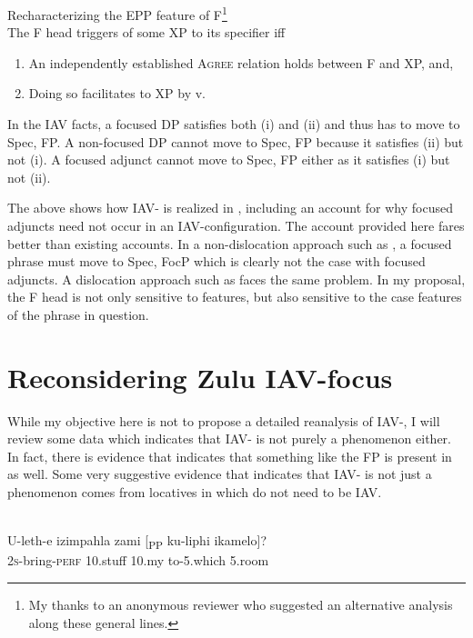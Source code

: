 \documentclass[output=paper
,newtxmath
,modfonts
,nonflat]{langsci/langscibook}
\begin{document}
\ea\label{ex:selvanathan:14}
Recharacterizing the EPP feature of F\footnote{My thanks to an anonymous reviewer who suggested an alternative analysis along these general lines.} \\
The F head triggers  of some XP to its specifier iff 

\begin{enumerate}
\item 
An independently established \textsc{Agree} relation holds between F and XP, and,
\item 
Doing so facilitates  to XP by v. 
\end{enumerate}
\z

In the  IAV facts, a focused DP satisfies both (i) and (ii) and thus has to move to Spec, FP. A non-focused DP cannot move to Spec, FP because it satisfies (ii) but not (i). A focused adjunct cannot move to Spec, FP either as it satisfies (i) but not (ii). 

The above shows how IAV- is realized in , including an account for why focused adjuncts need not occur in an IAV-configuration. The account provided here fares better than existing accounts. In a non-dislocation approach such as \citet{vanderwal2006}, a focused phrase must move to Spec, FocP which is clearly not the case with  focused adjuncts. A dislocation approach such as \citet{chengdowning2012} faces the same problem. In my proposal, the F head is not only sensitive to  features, but also sensitive to the case features of the phrase in question.

\section{ Reconsidering Zulu IAV-focus}

While my objective here is not to propose a detailed reanalysis of  IAV-, I will review some data which indicates that  IAV- is not purely a  phenomenon either. In fact, there is evidence that indicates that something like the FP is present in  as well. Some very suggestive evidence that indicates that  IAV- is not just a  phenomenon comes from locatives in  which do not need to be IAV. 

\ea\label{ex:selvanathan:15}
 \citep[168]{Buell2009}\\
\ea\label{ex:selvanathan:15a}
	\gll U-leth-e      izimpahla  zami   [\textsubscript{PP} ku-liphi      ikamelo]? \\
	2\textsc{s}{}-bring-\textsc{perf}  10.stuff   10.my   {}     to-5.which   5.room\\
	
\end{document}

